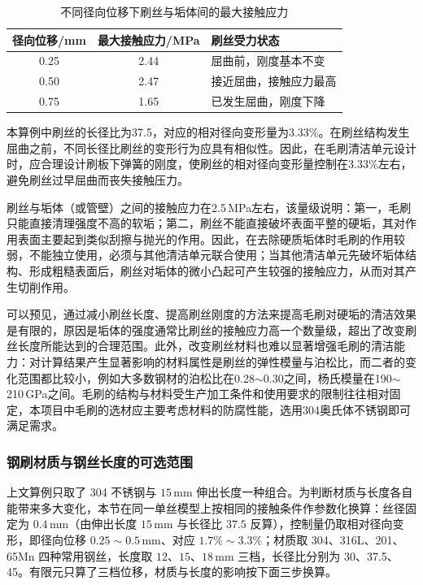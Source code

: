 \begin{table}[H]
	\centering
	\caption{不同径向位移下刷丝与垢体间的最大接触应力}
	\label{tab:brush_contact_stress}
	\renewcommand{\arraystretch}{1.3}
	\begin{tabularx}{0.85\textwidth}{cc>{\raggedright\arraybackslash}X}
		\toprule
		径向位移/mm & 最大接触应力/MPa & 刷丝受力状态 \\
		\midrule
		0.25 & 2.44 & 屈曲前，刚度基本不变 \\
		0.50 & 2.47 & 接近屈曲，接触应力最高 \\
		0.75 & 1.65 & 已发生屈曲，刚度下降 \\
		\bottomrule
	\end{tabularx}
\end{table}

本算例中刷丝的长径比为37.5，对应的相对径向变形量为3.33\%。在刷丝结构发生屈曲之前，不同长径比刷丝的变形行为应具有相似性。因此，在毛刷清洁单元设计时，应合理设计刷板下弹簧的刚度，使刷丝的相对径向变形量控制在3.33\%左右，避免刷丝过早屈曲而丧失接触压力。

刷丝与垢体（或管壁）之间的接触应力在2.5\,MPa左右，该量级说明：第一，毛刷只能直接清理强度不高的软垢；第二，刷丝不能直接破坏表面平整的硬垢，其对作用表面主要起到类似刮擦与抛光的作用。因此，在去除硬质垢体时毛刷的作用较弱，不能独立使用，必须与其他清洁单元联合使用；当其他清洁单元先破坏垢体结构、形成粗糙表面后，刷丝对垢体的微小凸起可产生较强的接触应力，从而对其产生切削作用。

可以预见，通过减小刷丝长度、提高刷丝刚度的方法来提高毛刷对硬垢的清洁效果是有限的，原因是垢体的强度通常比刷丝的接触应力高一个数量级，超出了改变刷丝长度所能达到的合理范围。此外，改变刷丝材料也难以显著增强毛刷的清洁能力：对计算结果产生显著影响的材料属性是刷丝的弹性模量与泊松比，而二者的变化范围都比较小，例如大多数钢材的泊松比在0.28$\sim$0.30之间，杨氏模量在190$\sim$210\,GPa之间。毛刷的结构与材料受生产加工条件和使用要求的限制往往相对固定，本项目中毛刷的选材应主要考虑材料的防腐性能，选用304奥氏体不锈钢即可满足需求。

\subsubsection{钢刷材质与钢丝长度的可选范围}
\label{subsec:brush_material_length}

上文算例只取了 304 不锈钢与 $15\,\mathrm{mm}$ 伸出长度一种组合。为判断材质与长度各自能带来多大变化，本节在同一单丝模型上按相同的接触条件作参数化换算：丝径固定为 $0.4\,\mathrm{mm}$（由伸出长度 $15\,\mathrm{mm}$ 与长径比 $37.5$ 反算），控制量仍取相对径向变形，即径向位移 $0.25\sim0.5\,\mathrm{mm}$、对应 $1.7\%\sim3.3\%$；材质取 304、316L、201、65Mn 四种常用钢丝，长度取 $12$、$15$、$18\,\mathrm{mm}$ 三档，长径比分别为 30、37.5、45。有限元只算了三档位移，材质与长度的影响按下面三步换算。

